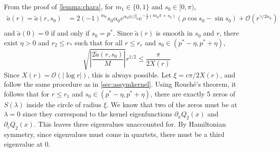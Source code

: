 \documentclass[thesis.tex]{subfiles}
\begin{document}
From the proof of \cref{lemma:chara}, for $m_1 \in \{0, 1\}$ and $s_0 \in [0, \pi)$,
\begin{align*}
\tilde{a}(r) = \tilde{a}(r, s_0) &= 2 (-1)^{m_0} s_0 \alpha_0 e^{\alpha_0 \phi/\beta_0} e^{-\frac{1}{\rho}(m_0 \pi + s_0) } \left( \rho \cos s_0 - \sin s_0 \right) + \mathcal{O}\left(r^{\gamma/2\alpha_0} \right)\\
\end{align*}
and $\tilde{a}(0) = 0$ if and only if $s_0 = p^*$. Since $\tilde{a}(r)$ is smooth in $s_0$ and $r$, there exist $\eta > 0$ and $r_2 \leq r_*$ such that for all $r \leq r_r$ and $s_0 \in (p^* - \eta, p^* + \eta)$, 
\begin{equation}
\sqrt{ \left| \frac{ 2 \tilde{a}(r, s_0) }{M} \right| }  r^{1/2} \leq \frac{\pi}{2 X(r)}
\end{equation}
Since $X(r) = \mathcal{O}(|\log r|)$, this is always possible. Let $\xi = c \pi / 2 X(r)$, and follow the same procedure as in \cref{sec:assymkernel}. Using Rouch\'{e}'s theorem, it follows that for $r \leq r_1$ and $s_0 \in (p^* - \eta, p^* + \eta)$, there are exactly 5 zeros of $S(\lambda)$ inside the circle of radius $\xi$. We know that two of the zeros must be at $\lambda = 0$ since they correspond to the kernel eigenfunctions $\partial_x Q_2(x)$ and $\partial_c Q_2(x)$. This leaves three eigenvalues unaccounted for.
By Hamiltonian symmetry, since eigenvalues must come in quartets, there must be a third eigenvalue at 0.
\end{document}
